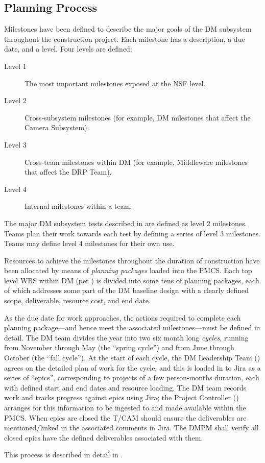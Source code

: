 \subsection{Planning Process}\label{sect:plan}

Milestones have been defined to describe the major goals of the DM subsystem throughout the construction project.
Each milestone has a description, a due date, and a level.
Four levels are defined:

\begin{description}
\item[Level 1]{The most important milestones exposed at the NSF level.}
\item[Level 2]{Cross-subsystem milestones (for example, DM milestones that affect the Camera Subsystem).}
\item[Level 3]{Cross-team milestones within DM (for example, Middleware milestones that affect the DRP Team).}
\item[Level 4]{Internal milestones within a team.}
\end{description}

The major DM subsystem tests described in  are defined as level 2 milestones.
Teams plan their work towards each test by defining a series of level 3 milestones.
Teams may define level 4 milestones for their own use.

Resources to achieve the milestones throughout the duration of construction have been allocated by means of \textit{planning packages} loaded into the PMCS.
Each top level WBS within DM (per ) is divided into some tens of planning packages, each of which addresses some part of the DM baseline design with a clearly defined scope, deliverable, resource cost, and end date.

As the due date for work approaches, the actions required to complete each planning package---and hence meet the associated milestones---must be defined in detail.
The DM team divides the year into two six month long \textit{cycles}, running from November through May (the ``spring cycle'') and from June through October (the ``fall cycle'').
At the start of each cycle, the DM Leadership Team () agrees on the detailed plan of work for the cycle, and this is loaded in to Jira as a series of ``epics'', corresponding to projects of a few person-months duration, each with defined start and end dates and resource loading.
The DM team records work and tracks progress against epics using Jira; the Project Controller () arranges for this information to be ingested to and made available within the PMCS.
When epics are closed the T/CAM should ensure the deliverables are mentioned/linked in the associated comments in Jira. The DMPM shall verify all closed epics have the defined deliverables associated with them.

This process is described in detail in .
